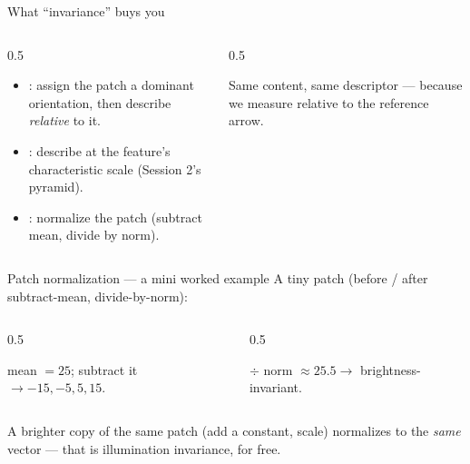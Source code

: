 \documentclass[10pt,aspectratio=169]{beamer}
\begin{document}
\begin{frame}{What ``invariance'' buys you}
  \begin{columns}[T]
    \begin{column}{0.5\textwidth}
      \begin{itemize}
        \item {}: assign the patch a dominant orientation, then describe \emph{relative} to it.
        \item {}: describe at the feature's characteristic scale (Session 2's pyramid).
        \item {}: normalize the patch (subtract mean, divide by norm).
      \end{itemize}
    \end{column}
    \begin{column}{0.5\textwidth}
      \begin{center}
      \end{center}
      {\scriptsize Same content, same descriptor — because we measure relative to the reference arrow.}
    \end{column}
  \end{columns}
\end{frame}

\begin{frame}{Patch normalization — a mini worked example}
  A tiny patch (before / after subtract-mean, divide-by-norm):
  \begin{columns}[T]
    \begin{column}{0.5\textwidth}
      \begin{center}
      \end{center}
      {\scriptsize mean $=25$; subtract it $\rightarrow -15,-5,5,15$.}
    \end{column}
    \begin{column}{0.5\textwidth}
      \begin{center}
      \end{center}
      {\scriptsize $\div$ norm $\approx 25.5 \rightarrow$ brightness-invariant.}
    \end{column}
  \end{columns}
  \begin{goodbox}
    A brighter copy of the same patch (add a constant, scale) normalizes to the \emph{same} vector —
    that is illumination invariance, for free.
  \end{goodbox}
\end{frame}
\end{document}
